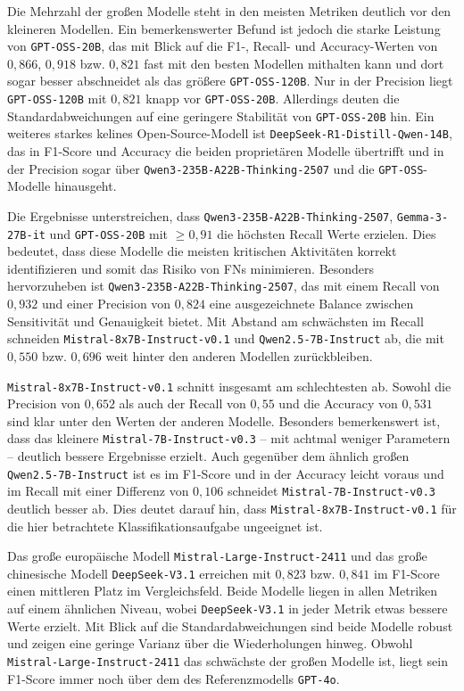 Die Mehrzahl der großen Modelle steht in den meisten Metriken deutlich vor den kleineren Modellen. Ein bemerkenswerter Befund ist jedoch die starke Leistung von \texttt{GPT-OSS-20B}, das mit Blick auf die F1-, Recall- und Accuracy-Werten von $0{,}866$, $0{,}918$ bzw. $0{,}821$ fast mit den besten Modellen mithalten kann und dort sogar besser abschneidet als das größere \texttt{GPT-OSS-120B}. Nur in der Precision liegt \texttt{GPT-OSS-120B} mit $0{,}821$ knapp vor \texttt{GPT-OSS-20B}. Allerdings deuten die Standardabweichungen auf eine geringere Stabilität von \texttt{GPT-OSS-20B} hin. Ein weiteres starkes kelines Open-Source-Modell ist \texttt{DeepSeek-R1-Distill-Qwen-14B}, das in F1-Score und Accuracy die
beiden proprietären Modelle übertrifft und in der Precision sogar über \texttt{Qwen3-235B-A22B-Thinking-2507} und die \texttt{GPT-OSS}-Modelle hinausgeht.

Die Ergebnisse unterstreichen, dass \texttt{Qwen3-235B-A22B-Thinking-2507}, \texttt{Gemma-3-27B-it} und \texttt{GPT-OSS-20B} mit $\geq 0{,}91$ die höchsten Recall Werte erzielen. Dies bedeutet, dass diese Modelle die meisten kritischen Aktivitäten korrekt identifizieren und somit das Risiko von \acp{FN} minimieren. Besonders hervorzuheben ist \texttt{Qwen3-235B-A22B-Thinking-2507}, das mit einem Recall von $0{,}932$ und einer Precision von $0{,}824$ eine ausgezeichnete Balance zwischen Sensitivität und Genauigkeit bietet. Mit Abstand am schwächsten im Recall schneiden \texttt{Mistral-8x7B-Instruct-v0.1} und \texttt{Qwen2.5-7B-Instruct} ab, die mit $0{,}550$ bzw. $0{,}696$ weit hinter den anderen Modellen zurückbleiben.

\texttt{Mistral-8x7B-Instruct-v0.1} schnitt insgesamt am schlechtesten ab. Sowohl die Precision von $0{,}652$ als auch der Recall von $0{,}55$ und die Accuracy von $0{,}531$ sind klar unter den Werten der anderen Modelle. Besonders bemerkenswert ist, dass das kleinere \texttt{Mistral-7B-Instruct-v0.3} – mit achtmal weniger Parametern – deutlich bessere Ergebnisse erzielt. Auch gegenüber dem ähnlich großen \texttt{Qwen2.5-7B-Instruct} ist es im F1-Score und in der Accuracy leicht voraus und im Recall mit einer Differenz von $0{,}106$ schneidet \texttt{Mistral-7B-Instruct-v0.3} deutlich besser ab. Dies deutet darauf hin, dass \texttt{Mistral-8x7B-Instruct-v0.1} für die hier betrachtete Klassifikationsaufgabe ungeeignet ist.

Das große europäische Modell \texttt{Mistral-Large-Instruct-2411} und das große chinesische Modell \texttt{DeepSeek-V3.1} erreichen mit $0{,}823$ bzw. $0{,}841$ im F1-Score einen mittleren Platz im Vergleichsfeld. Beide Modelle liegen in allen Metriken auf einem ähnlichen Niveau, wobei \texttt{DeepSeek-V3.1} in jeder Metrik etwas bessere Werte erzielt. Mit Blick auf die Standardabweichungen sind beide Modelle robust und zeigen eine geringe Varianz über die Wiederholungen hinweg. Obwohl \texttt{Mistral-Large-Instruct-2411} das schwächste der großen Modelle ist, liegt sein F1-Score immer noch über dem des Referenzmodells \texttt{GPT-4o}.

